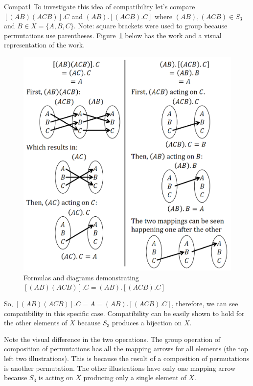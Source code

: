 \begin{example}{Compat1} To investigate this idea of compatibility let's compare $[(AB)(ACB)].C$ and $(AB).[(ACB).C]$ where $(AB),(ACB) \in S_3$ and $B \in X=\{A,B,C\}$. Note: square brackets were used to group because permutations use parentheses. Figure~\ref{fig:Compatibility1} below has the work and a visual representation of the work.

\begin{figure}[htbp]
\begin{center}
\includegraphics[width=4.75in]{images/Compatibility1.png}
\caption{Formulas and diagrams demonstrating $[(AB)(ACB)].C=(AB).[(ACB).C]$}\label{fig:Compatibility1}
\end{center}
\end{figure}

So, $[(AB)(ACB)].C=A=(AB).[(ACB).C]$, therefore, we can see compatibility in this specific case. Compatibility can be easily shown to hold for the other elements of $X$ because $S_3$ produces a bijection on $X$.

Note the visual difference in the two operations. The group operation of composition of permutations has all the mapping arrows for all elements (the top left two illustrations). This is because the result of a composition of permutations is another permutation. The other illustrations have only one mapping arrow because $S_3$ is acting on $X$ producing only a single element of $X$.
\end {example}

